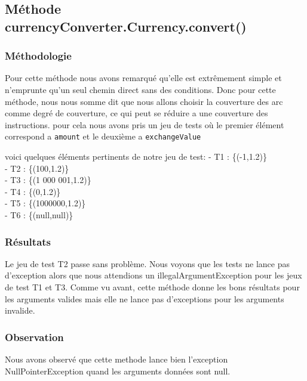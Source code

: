 \documentclass[11pt]{article}
\begin{document}
\subsection{Méthode currencyConverter.Currency.convert()}
\subsubsection{Méthodologie}
Pour cette méthode nous avons remarqué qu'elle est extrêmement simple et n'emprunte qu'un seul chemin direct sans des conditions. Donc pour cette méthode, nous nous somme dit que nous allons choisir la couverture des arc comme degré de couverture, ce qui peut se réduire a une couverture des instructions.
pour cela nous avons pris un jeu de tests  où le premier élément correspond a \texttt{amount} et le deuxième a \texttt{exchangeValue}

voici quelques éléments pertinents de notre jeu de test:
    \hspace{-7mm}
    - T1 : \{(-1,1.2)\} \\
    - T2 : \{(100,1.2)\} \\
    - T3 : \{(1 000 001,1.2)\} \\
    - T4 : \{(0,1.2)\} \\
    - T5 : \{(1000000,1.2)\} \\
    - T6 : \{(null,null)\} \\
    

\subsubsection{Résultats}
Le jeu de test T2 passe sans problème. Nous voyons que les tests ne lance pas d'exception alors que nous attendions un illegalArgumentException pour les jeux de test T1 et T3. Comme vu avant, cette méthode donne les bons résultats pour les arguments valides mais elle ne lance pas d'exceptions pour les arguments invalide.


\subsubsection{Observation}
Nous avons observé que cette methode lance bien l'exception NullPointerException quand les arguments données sont null.
\end{document}
